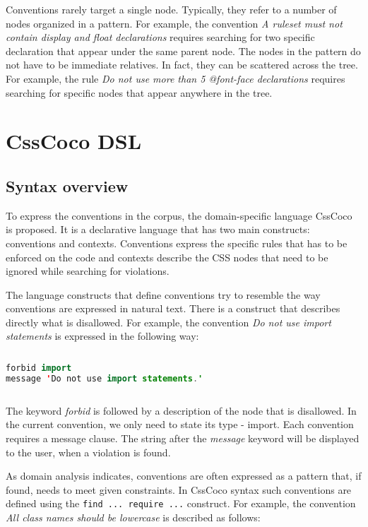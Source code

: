\documentclass[parskip=full]{uvamscse}
\begin{document}
Conventions rarely target a single node. Typically, they refer to a number of nodes organized in a
pattern. For example, the convention \textit{A ruleset must not contain display and float
declarations} requires searching for two specific declaration that appear under the same parent
node. The nodes in the pattern do not have to be immediate relatives. In fact, they can be scattered
across the tree. For example, the rule \textit{Do not use more than 5 @font-face declarations}
requires searching for specific nodes that appear anywhere in the tree.

\section{CssCoco DSL}

\subsection{Syntax overview}

To express the conventions in the corpus, the domain-specific language CssCoco is proposed. It is a
declarative language that has two main constructs: conventions and contexts. Conventions express the
specific rules that has to be enforced on the code and contexts describe the CSS nodes that need to
be ignored while searching for violations. 

The language constructs that define conventions try to resemble the way conventions are expressed in
natural text. There is a construct that describes directly what is disallowed. For example, the
convention \textit{Do not use import statements} is expressed in the following way:

\begin{sourcecode}
\begin{lstlisting}[style=mono,language=Java]
forbid import
message 'Do not use import statements.'
\end{lstlisting}
\end{sourcecode}

The keyword \textit{forbid} is followed by a description of the node that is disallowed. In the
current convention, we only need to state its type - import. Each convention requires a message
clause. The string after the \textit{message} keyword will be displayed to the user, when a
violation is found.

As domain analysis indicates, conventions are often expressed as a pattern that, if found, needs to
meet given constraints. In CssCoco syntax such conventions are defined using the \texttt{find ...
require ...} construct. For example, the convention \textit{All class names should be lowercase} is
described as follows:
\end{document}
